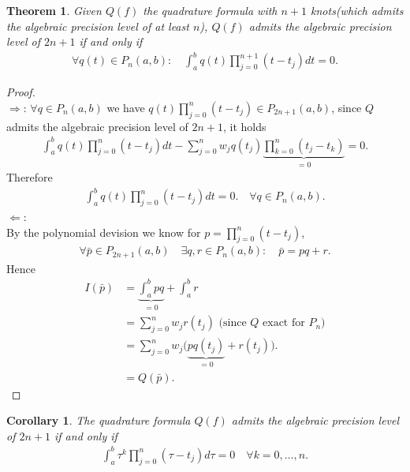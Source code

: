 \documentclass[a4paper,12pt,oneside,fleqn]{book}
\newtheorem{theorem}{Theorem}[section]
\newtheorem{corollary}{Corollary}[theorem]
\theoremstyle{definition}
\theoremstyle{remark}
\begin{document}
\begin{theorem} Given $Q(f)$ the quadrature formula with $n + 1$ knots(which admits the algebraic precision level of at least $n$), $Q(f)$ admits the algebraic precision level of $2n + 1$ if and only if 
\begin{align*}
	\forall q(t) \in P_{n}(a, b): \quad \int_a^b q(t) \prod_{j = 0}^{n + 1} (t - t_j) dt = 0. 
\end{align*}
\end{theorem}
\begin{proof}\quad\\
\textbf{$\Rightarrow$}: $\forall q \in P_n(a, b)$ we have $q(t)\prod_{j = 0}^n (t - t_j) \in P_{2n + 1}(a, b)$, since $Q$ admits the algebraic precision level of $2n + 1$, it holds
\begin{align*}
	\int_a^b q(t)\prod_{j = 0}^{n}(t - t_j)dt - \sum_{j = 0}^n w_j q(t_j)\underbrace{ \prod_{k = 0}^n (t_j - t_k)}_{ = 0} = 0.
\end{align*} 
Therefore 
\begin{align*}
	\int_a^b q(t) \prod_{j = 0}^n (t - t_j) dt = 0. \quad \forall q \in P_n(a, b). 
\end{align*}
$\Leftarrow$: \qquad\\ 
By the polynomial devision we know for $p = \prod_{j = 0}^n(t - t_j)$, 
\begin{align*}
	\forall \bar{p} \in P_{2n + 1}(a, b) \quad \exists q, r \in P_{n}(a, b):\quad \bar{p} = pq + r.
\end{align*}
Hence
\begin{align*}
	I(\bar{p}) &= \underbrace{ \int_a^b pq}_{ = 0}  + \int_a^b r\\
	& = \sum_{j = 0}^n w_j r(t_j)\text{ (since $Q$ exact for $P_n$)}\\
	& = \sum_{j = 0}^n w_j \bigg(\underbrace{ pq(t_j)}_{ = 0} + r(t_j) \bigg). \\
	& = Q(\bar{p}).  
\end{align*}
\end{proof}

\begin{corollary}
	The quadrature formula $Q(f)$ admits the algebraic precision level of $2n + 1$ if and only if 
	\begin{align*}
		\int_a^b \tau^k \prod_{j = 0}^n ( \tau - t_j) d\tau = 0 \quad \forall k = 0, \dots, n. 
	\end{align*}
\end{corollary}
\end{document}
